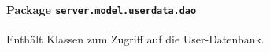 \FloatBarrier
\paragraph[Package server.model.userdata.dao]{Package \texttt{server.model.userdata.dao}}
Enthält Klassen zum Zugriff auf die User-Datenbank.
       